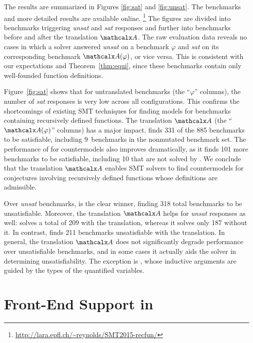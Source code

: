 The results are summarized in Figures \ref{fig:sat} and \ref{fig:unsat}.
The benchmarks and more detailed results are available online.%
\footnote{\url{http://lara.epfl.ch/~reynolds/SMT2015-recfun/}}
The figures are divided into benchmarks triggering \emph{unsat} and \emph{sat}
responses and further into benchmarks before and after the translation $\conv$.
The raw evaluation data reveals no cases in which a solver answered
\emph{unsat} on a benchmark $\varphi$ and \emph{sat} on its
corresponding benchmark $\conv( \varphi )$, or vice versa.
This is consistent with our expectations and Theorem~\ref{thm:equi}, 
since these benchmarks contain only well-founded function definitions.

Figure~\ref{fig:sat} shows that for untranslated benchmarks (the ``$\varphi$''
columns), the number of \emph{sat} responses is very low across all
configurations. This confirms the shortcomings of existing SMT techniques for
finding models for benchmarks containing recursively defined functions.
%
The translation $\conv$ (the ``$\conv(\varphi)$'' columns) has a major
impact. \cvcf finds 331 of the 885 benchmarks to be satisfiable,
including 9~benchmarks in the nonmutated \leon benchmark set. The
performance of \ziiib for countermodels also improves dramatically, as it
finds 101 more benchmarks to be satisfiable, including 10 that are not solved by \cvcf.
%
We conclude that the translation $\conv$ enables SMT
solvers to find countermodels for conjectures involving recursively defined functions
whose definitions are admissible.

Over \emph{unsat} benchmarks, \cvci is the
clear winner, finding 318 total benchmarks to be unsatisfiable. Moreover, the
translation $\conv$ helps \ziii for \emph{unsat} responses as well:
\ziii solves a total of 209 with the translation, whereas it solves only 187 without it.
%
In contrast, \cvcd finds 211 benchmarks unsatisfiable with the translation.
In general, the translation $\conv$ does not significantly degrade performance
over unsatisfiable benchmarks, and in some cases it actually aids the solver 
in determining unsatisfiability. The exception is \cvci, whose inductive
arguments are guided by the types of the quantified variables.

\section{Front-End Support in \cvc}
\label{sec:front-end}

